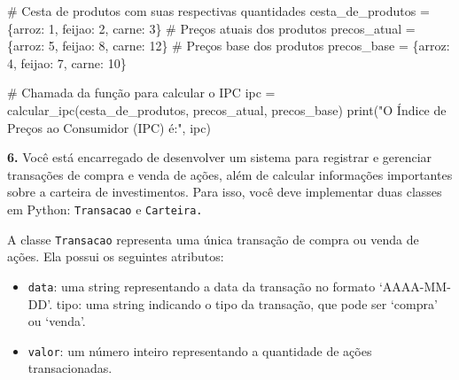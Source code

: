 \documentclass[
  portuguese,
  letterpaper,
  DIV=11,
  numbers=noendperiod]{scrreprt}
\newenvironment{Shaded}{\begin{snugshade}}{\end{snugshade}}
\newcommand{\BuiltInTok}[1]{\textcolor[rgb]{0.00,0.23,0.31}{#1}}
\newcommand{\CommentTok}[1]{\textcolor[rgb]{0.37,0.37,0.37}{#1}}
\newcommand{\DecValTok}[1]{\textcolor[rgb]{0.68,0.00,0.00}{#1}}
\newcommand{\NormalTok}[1]{\textcolor[rgb]{0.00,0.23,0.31}{#1}}
\newcommand{\OperatorTok}[1]{\textcolor[rgb]{0.37,0.37,0.37}{#1}}
\newcommand{\StringTok}[1]{\textcolor[rgb]{0.13,0.47,0.30}{#1}}
\providecommand{\tightlist}{%
  \setlength{\itemsep}{0pt}\setlength{\parskip}{0pt}}
\theoremstyle{definition}
\theoremstyle{remark}
\begin{document}
\begin{Shaded}
\begin{Highlighting}[]
\CommentTok{\# Cesta de produtos com suas respectivas quantidades}
\NormalTok{cesta\_de\_produtos }\OperatorTok{=}\NormalTok{ \{}\StringTok{\textquotesingle{}arroz\textquotesingle{}}\NormalTok{: }\DecValTok{1}\NormalTok{, }\StringTok{\textquotesingle{}feijao\textquotesingle{}}\NormalTok{: }\DecValTok{2}\NormalTok{, }\StringTok{\textquotesingle{}carne\textquotesingle{}}\NormalTok{: }\DecValTok{3}\NormalTok{\}  }
\CommentTok{\# Preços atuais dos produtos}
\NormalTok{precos\_atual }\OperatorTok{=}\NormalTok{ \{}\StringTok{\textquotesingle{}arroz\textquotesingle{}}\NormalTok{: }\DecValTok{5}\NormalTok{, }\StringTok{\textquotesingle{}feijao\textquotesingle{}}\NormalTok{: }\DecValTok{8}\NormalTok{, }\StringTok{\textquotesingle{}carne\textquotesingle{}}\NormalTok{: }\DecValTok{12}\NormalTok{\}      }
\CommentTok{\# Preços base dos produtos}
\NormalTok{precos\_base }\OperatorTok{=}\NormalTok{ \{}\StringTok{\textquotesingle{}arroz\textquotesingle{}}\NormalTok{: }\DecValTok{4}\NormalTok{, }\StringTok{\textquotesingle{}feijao\textquotesingle{}}\NormalTok{: }\DecValTok{7}\NormalTok{, }\StringTok{\textquotesingle{}carne\textquotesingle{}}\NormalTok{: }\DecValTok{10}\NormalTok{\}      }

\CommentTok{\# Chamada da função para calcular o IPC}
\NormalTok{ipc }\OperatorTok{=}\NormalTok{ calcular\_ipc(cesta\_de\_produtos, precos\_atual, precos\_base)}
\BuiltInTok{print}\NormalTok{(}\StringTok{"O Índice de Preços ao Consumidor (IPC) é:"}\NormalTok{, ipc)}
\end{Highlighting}
\end{Shaded}

\textbf{6.} Você está encarregado de desenvolver um sistema para
registrar e gerenciar transações de compra e venda de ações, além de
calcular informações importantes sobre a carteira de investimentos. Para
isso, você deve implementar duas classes em Python: \texttt{Transacao} e
\texttt{Carteira.}

A classe \texttt{Transacao} representa uma única transação de compra ou
venda de ações. Ela possui os seguintes atributos:

\begin{itemize}
\tightlist
\item
  \texttt{data}: uma string representando a data da transação no formato
  `AAAA-MM-DD'. tipo: uma string indicando o tipo da transação, que pode
  ser `compra' ou `venda'.
\item
  \texttt{valor}: um número inteiro representando a quantidade de ações
  transacionadas.
\end{itemize}
\end{document}
